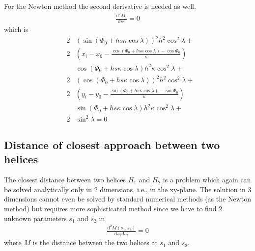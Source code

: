 \documentclass[twoside]{article}
\begin{document}
For the Newton method the second derivative is needed as well.
\begin{eqnarray}
\frac{\mathrm{d}^2M_i}{\mathrm{d}s^2}  = 0
\end{eqnarray}
which is
\begin{eqnarray}
    &2&\left (\sin(\Phi_0+hs\kappa\cos\lambda)\right )^{2}{h}^{2}\cos^{2}\lambda + \nonumber \\
    &2&\left (x_i-{x_0}-{\frac {\cos(\Phi_0+hs\kappa\cos\lambda)-\cos\Phi_0}{\kappa}}\right ) \nonumber \\
    & &\cos(\Phi_0+hs\kappa\cos\lambda){h}^{2}\kappa \cos^{2}\lambda + \nonumber \\
    &2&\left (\cos(\Phi_0+hs\kappa\cos\lambda)\right )^{2}{h}^{2}\cos^{2}\lambda +  \nonumber \\
    &2&\left (y_i-{y_0}-{\frac {\sin(
                \Phi_0+hs\kappa\cos\lambda)-\sin\Phi_0}{\kappa}}\right ) \nonumber \\
    & &\sin(\Phi_0+hs\kappa\cos\lambda){h}^{2}\kappa
    \cos^{2}\lambda + \nonumber \\
    &2&\sin^2\lambda = 0 
\end{eqnarray}

\subsection{Distance of closest approach between two helices}
 The closest distance between two helices
$H_1$ and $H_2$ is a problem which again can be solved analytically
only in 2 dimensions, i.e., in the xy-plane.  The solution in 3
dimensions cannot even be solved by standard numerical methods (as the
Newton method) but requires more sophisticated method since we have to
find 2 unknown parameters $s_1$ and $s_2$ in
\begin{eqnarray}
\frac{\mathrm{d}^2 M(s_1, s_2)}{\mathrm{d} s_1 \mathrm{d} s_2} = 0
\end{eqnarray}
where $M$ is the distance between the two helices at $s_1$ and $s_2$.
\end{document}
